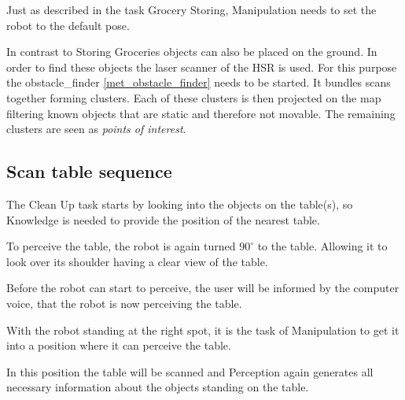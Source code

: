 \documentclass[main.tex]{subfiles}
\begin{document}
	\begin{manipulation}
	Just as described in the task Grocery Storing, Manipulation needs to set the robot to the default pose.
	\end{manipulation}

	\begin{navigation}
		In contrast to Storing Groceries objects can also be placed on the ground. In order to find these objects the laser scanner of the HSR is used. For this purpose the obstacle\_finder \ref{met_obstacle_finder} needs to be started. It bundles scans together forming clusters. Each of these clusters is then projected on the map filtering known objects that are static and therefore not movable. The remaining clusters are seen as \textit{points of interest}. 
	\end{navigation}

	\subsection{Scan table sequence}
	
	\begin{knowledge}
	The Clean Up task starts by looking into the objects on the table(s), so Knowledge is needed to provide the position of the nearest table.
	\end{knowledge}
	
	\begin{navigation}
	To perceive the table, the robot is again turned $90^\circ$ to the table. Allowing it to look over its shoulder having a clear view of the table.
	\end{navigation}
	
	\begin{nlp}
	Before the robot can start to perceive, the user will be informed by the computer voice, that the robot is now perceiving the table.
	\end{nlp}
	
	\begin{manipulation}
	With the robot standing at the right spot, it is the task of Manipulation to get it into a position where it can perceive the table.
   \end{manipulation} 
	
	\begin{perception}
	In this position the table will be scanned and Perception again generates all necessary information about the objects standing on the table.
	\end{perception}
	
\end{document}
